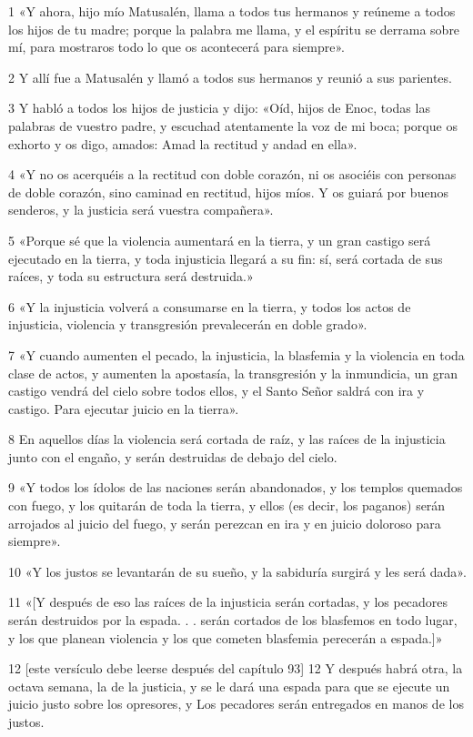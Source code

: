 \par 1 «Y ahora, hijo mío Matusalén, llama a todos tus hermanos y reúneme a todos los hijos de tu madre; porque la palabra me llama, y ​​el espíritu se derrama sobre mí, para mostraros todo lo que os acontecerá para siempre».
\par 2 Y allí fue a Matusalén y llamó a todos sus hermanos y reunió a sus parientes.
\par 3 Y habló a todos los hijos de justicia y dijo: «Oíd, hijos de Enoc, todas las palabras de vuestro padre, y escuchad atentamente la voz de mi boca; porque os exhorto y os digo, amados: Amad la rectitud y andad en ella».
\par 4 «Y no os acerquéis a la rectitud con doble corazón, ni os asociéis con personas de doble corazón, sino caminad en rectitud, hijos míos. Y os guiará por buenos senderos, y la justicia será vuestra compañera».
\par 5 «Porque sé que la violencia aumentará en la tierra, y un gran castigo será ejecutado en la tierra, y toda injusticia llegará a su fin: sí, será cortada de sus raíces, y toda su estructura será destruida.»
\par 6 «Y la injusticia volverá a consumarse en la tierra, y todos los actos de injusticia, violencia y transgresión prevalecerán en doble grado».
\par 7 «Y cuando aumenten el pecado, la injusticia, la blasfemia y la violencia en toda clase de actos, y aumenten la apostasía, la transgresión y la inmundicia, un gran castigo vendrá del cielo sobre todos ellos, y el Santo Señor saldrá con ira y castigo. Para ejecutar juicio en la tierra».
\par 8 En aquellos días la violencia será cortada de raíz, y las raíces de la injusticia junto con el engaño, y serán destruidas de debajo del cielo.
\par 9 «Y todos los ídolos de las naciones serán abandonados, y los templos quemados con fuego, y los quitarán de toda la tierra, y ellos (es decir, los paganos) serán arrojados al juicio del fuego, y serán perezcan en ira y en juicio doloroso para siempre».
\par 10 «Y los justos se levantarán de su sueño, y la sabiduría surgirá y les será dada».
\par 11 «[Y después de eso las raíces de la injusticia serán cortadas, y los pecadores serán destruidos por la espada. . . serán cortados de los blasfemos en todo lugar, y los que planean violencia y los que cometen blasfemia perecerán a espada.]»
\par 12 [este versículo debe leerse después del capítulo 93] 12 Y después habrá otra, la octava semana, la de la justicia, y se le dará una espada para que se ejecute un juicio justo sobre los opresores, y Los pecadores serán entregados en manos de los justos.
